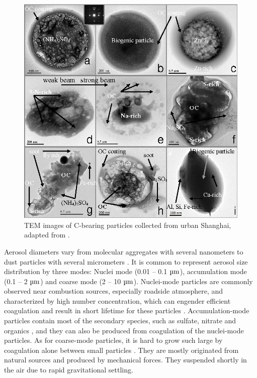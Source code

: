 \documentclass[edeposit,fullpage]{uiucthesis2009}
\begin{document}
\begin{figure}
	\centering
	\includegraphics[scale=0.40]{chap1_figs/thesis_chap1_fig2.png}
	\caption{TEM images of C-bearing particles collected from urban Shanghai, adapted from \citet{fu2012morphology}.}
	\label{fig:chap1-mixing}
\end{figure}


Aerosol diameters vary from molecular aggregates with several nanometers to dust particles with several micrometers \citep{MCMURRY200320}. It is common to represent aerosol size distribution by three modes: Nuclei mode (0.01 -- 0.1 $\rm \mu m$), accumulation mode (0.1 -- 2 $\rm \mu m$) and coarse mode (2 -- 10 $ \rm \mu m$). Nuclei-mode particles are commonly observed near combustion sources, especially roadside atmosphere, and characterized by high number concentration, which can engender efficient coagulation and result in short lifetime for these particles \citep{fushimi2008atmospheric}. Accumulation-mode particles contain most of the secondary species, such as sulfate, nitrate and organics \citep{zhang2005time}, and they can also be produced from coagulation of the nuclei-mode particles. As for coarse-mode particles, it is hard to grow such large by coagulation alone between small particles \citep{friedlander1991scavenging, lee2005size}. They are mostly originated from natural sources and produced by mechanical forces. They suspended shortly in the air due to rapid gravitational settling. 
\end{document}
